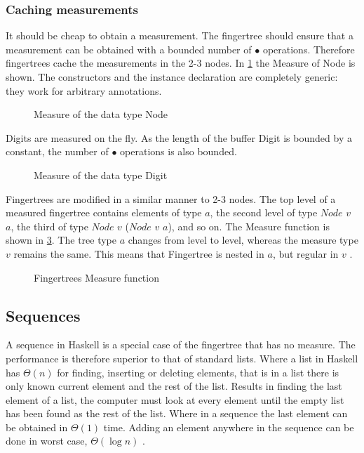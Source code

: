 \subsubsection{Caching measurements}
It should be cheap to obtain a measurement. The fingertree should ensure that a
measurement can be obtained with a bounded number of $\bullet$ operations.
Therefore fingertrees cache the measurements in the 2-3 nodes. In
\cref{fig:measureNode} the Measure of Node is shown.
The constructors and the instance declaration are completely generic: they
work for arbitrary annotations.

\begin{figure}[h!]

\caption{Measure of the data type Node \label{fig:measureNode}}
\end{figure}

Digits are measured on the fly. As the length of the buffer Digit is bounded by
a constant, the number of $\bullet$ operations is also bounded.

\begin{figure}[h!]

\caption{Measure of the data type Digit \label{fig:measureDigit}}
\end{figure}

Fingertrees are modified in a similar manner to 2-3 nodes.
The top level of a measured fingertree contains elements of type $a$, the second
level of type $Node$ $v$ $a$, the third of type $Node$ $v$ ($Node$ $v$ $a$), and
so on. The Measure function is shown in \cref{fig:measureFingerTree}. The tree 
type $a$ changes from level to level, whereas the measure type $v$ remains the 
same. This means that Fingertree is nested in $a$, but regular in $v$ \cite{fingertree}.

\begin{figure}[h!]

\caption{Fingertrees Measure function \label{fig:measureFingerTree}}
\end{figure}


\subsection{Sequences}
A sequence in Haskell is a special case of the fingertree that has no measure.
The performance is therefore superior to that of standard lists. Where a list in
Haskell has $\Theta(n)$ for finding, inserting or deleting elements, that is in
a list there is only known current element and the rest of the list. Results in 
finding the last element of a list, the computer must look at every element
until the empty list has been found as the rest of the list. Where in a sequence
the last element can be obtained in $\Theta(1)$ time. Adding an element anywhere
in the sequence can be done in worst case, $\Theta(\log n)$ \cite{fingertree}.
